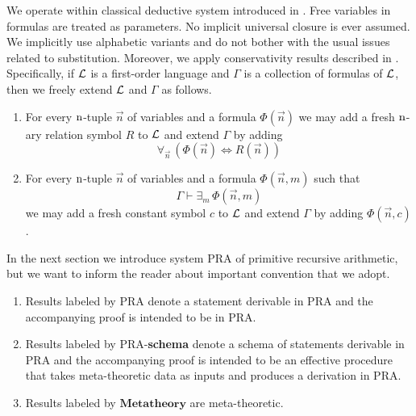 \documentclass[10pt]{amsart}
\newcommand{\mforall}{\boldsymbol{\forall}}
\newcommand{\mexists}{\boldsymbol{\exists}}
\newcommand{\mequiv}{\boldsymbol{\Leftrightarrow}}
\begin{document}
We operate within classical deductive system introduced in \cite{Systems_of_first_order_logic}. Free variables in formulas are treated as parameters. No implicit universal closure is ever assumed. We implicitly use alphabetic variants and do not bother with the usual issues related to substitution. Moreover, we apply conservativity results described in \cite{Systems_of_first_order_logic}. Specifically, if ${\mathcal L}$ is a first-order language and $\Gamma$ is a collection of formulas of ${\mathcal L}$, then we freely extend ${\mathcal L}$ and $\Gamma$ as follows.
\begin{enumerate}[label=\textbf{\arabic*.}, leftmargin=3.0em]
	\item For every $\rm{n}$-tuple $\vec{n}$ of variables and a formula $\Phi(\vec{n})$ we may add a fresh $\rm{n}$-ary relation symbol $R$ to ${\mathcal L}$ and extend $\Gamma$ by adding
	      $$\mforall_{\vec{n}}\,\left(\Phi(\vec{n}) \mequiv R(\vec{n})\right)$$
	\item For every $\rm{n}$-tuple $\vec{n}$ of variables and a formula $\Phi(\vec{n},m)$ such that
	      $$\Gamma \vdash \mexists_m\,\Phi(\vec{n},m)$$
	      we may add a fresh constant symbol $c$ to ${\mathcal L}$ and extend $\Gamma$ by adding $\Phi(\vec{n},c)$.
\end{enumerate}
\noindent
In the next section we introduce system $\mathrm{PRA}$ of primitive recursive arithmetic, but we want to inform the reader about important convention that we adopt.
\begin{enumerate}[label=\textbf{\arabic*.}, leftmargin=3.0em]
	\item Results labeled by $\mathrm{PRA}$ denote a statement derivable in $\mathrm{PRA}$ and the accompanying proof is intended to be in $\mathrm{PRA}$.
  \item Results labeled by $\mathrm{PRA}$-\textbf{schema} denote a schema of statements derivable in $\mathrm{PRA}$ and the accompanying proof is intended to be an effective procedure that takes meta-theoretic data as inputs and produces a derivation in $\mathrm{PRA}$.
  \item Results labeled by $\textbf{Metatheory}$ are meta-theoretic.  
\end{enumerate}
\end{document}

